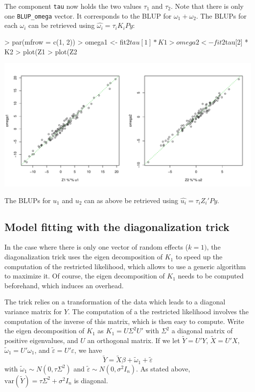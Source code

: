\documentclass{article}
\renewenvironment{Schunk}{\vspace{\topsep}}{\vspace{\topsep}}
\begin{document}
  The component \verb!tau! now holds the two values $\tau_1$ and $\tau_2$.
  Note that there is only one \verb!BLUP_omega! vector. It corresponds to
  the BLUP for $\omega_1 + \omega_2$. The BLUPs for each $\omega_i$ can
  be retrieved using $\widehat{\omega_i} = \tau_i K_i Py$:

\begin{center}
\begin{Schunk}
\begin{Sinput}
> par(mfrow = c(1, 2))
> omega1 <- fit2$tau[1] * K1 %
> omega2 <- fit2$tau[2] * K2 %
> plot(Z1 %
> plot(Z2 %
\end{Sinput}
\end{Schunk}
\includegraphics{gaston-045}
\end{center}

  The BLUPs for $u_1$ and $u_2$ can as above be retrieved using $\widehat{u_i} = \tau_i Z_i' P y$.
  
  \subsection{Model fitting with the diagonalization trick}

  In the case where there is only one vector of random effects ($k = 1)$, the
  diagonalization trick uses the eigen decomposition of $K_1$ to speed up the 
  computation of the restricted likelihood, which allows to use a generic 
  algorithm to maximize it. Of course, the eigen decomposition of $K_1$ needs 
  to be computed beforehand, which induces an overhead. 

  The trick relies on a transformation of the data which leads to a diagonal variance matrix for $Y$. 
  The computation of a the restricted likelihood
  involves the computation of the inverse of this matrix, which is then easy to compute.
  Write the eigen decomposition of $K_1$ as $K_1 = U \Sigma^2 U'$ with $\Sigma^2$
  a diagonal matrix of positive eigenvalues, and $U$ an orthogonal matrix.
  If we let $\tilde Y = U'Y$, $\tilde X = U'X$, $\tilde \omega_1 = U' \omega_1$, and
  $\tilde\varepsilon = U' \varepsilon$, we have
  $$ \tilde Y = \tilde X\beta + \tilde \omega_1 + \tilde \varepsilon $$
  with $\tilde \omega_1 \sim N\left(0,\tau \Sigma^2\right)$ and $ \tilde\varepsilon \sim N(0,\sigma^2 I_n) $.
  As stated above, $\mathrm{var}\left(\tilde Y\right) = \tau \Sigma^2 + \sigma^2 I_n$ is diagonal.
\end{document}
